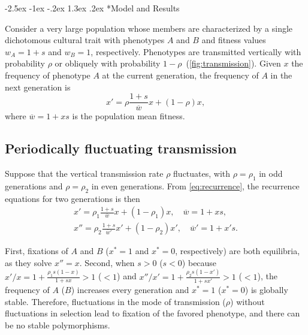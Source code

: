 \documentclass[14pt]{extarticle}
\makeatletter
\renewcommand\section{\@startsection {section}{1}{\z@}%
     {-2.5ex \@plus -1ex \@minus -.2ex}%
     {1.3ex \@plus.2ex}%
    {\Large\bfseries}}
\makeatother
\begin{document}



\section*{Model and Results}

Consider a very large population whose members are characterized by a single dichotomous cultural trait with phenotypes $A$ and $B$ and fitness values $w_A=1+s$ and $w_B=1$, respectively.
Phenotypes are transmitted vertically with probability $\rho$ or obliquely with probability $1-\rho$~(\autoref{fig:transmission}).
Given $x$ the frequency of phenotype $A$ at the current generation, the frequency of $A$ in the next generation is
\begin{equation} \label{eq:recurrence}
x' = \rho \frac{1+s}{\overline w} x + (1-\rho)x,
\end{equation}
where $\overline w = 1 + xs$ is the population mean fitness.

\subsection*{Periodically fluctuating transmission}

Suppose that the vertical transmission rate $\rho$ fluctuates, with $\rho = \rho_1$ in odd generations and $\rho = \rho_2$ in even generations.
From \eqref{eq:recurrence}, the recurrence equations for two generations is then
\begin{equation}\begin{aligned} \label{eq:recurrence_two_generations}
x' = \rho_1 \frac{1+s}{\overline w} x + (1-\rho_1)x, \quad \overline w = 1 + xs, \\
x'' = \rho_2 \frac{1+s}{\overline w'} x' + (1-\rho_2)x', \quad \overline w' = 1 + x's.
\end{aligned}\end{equation}

First, fixations of $A$ and $B$ ($x^*=1$ and $x^*=0$, respectively) are both equilibria, as they solve $x''=x$.
Second, when $s>0$ ($s<0$) because $x'/x = 1+\frac{\rho_1 s (1-x)}{1+sx} > 1$ ($<1$) and $x''/x' = 1+\frac{\rho_2 s (1-x')}{1+sx'} > 1$ ($<1$), the frequency of $A$ ($B$) increases every generation and $x^*=1$ ($x^*=0$) is globally stable.
Therefore, fluctuations in the mode of transmission ($\rho$) without fluctuations in selection lead to fixation of the favored phenotype, and there can be no stable polymorphisms.
\end{document}
